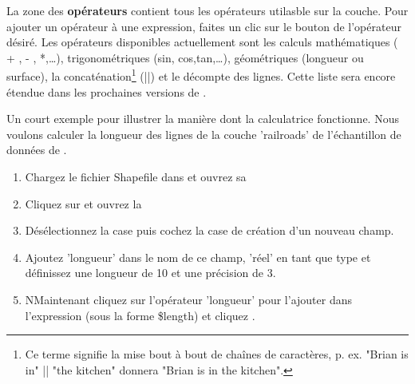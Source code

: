La zone des \textbf{opérateurs} contient tous les opérateurs utilasble sur la couche. Pour ajouter un opérateur à une expression, faites un clic sur le bouton de l'opérateur désiré. Les opérateurs disponibles actuellement sont les calculs mathématiques ( + , - , *,\dots), trigonométriques (sin, cos,tan,\dots), géométriques (longueur ou surface), la concaténation\footnote{Ce terme signifie la mise bout à bout de chaînes de caractères, p. ex. "Brian is in" || "the kitchen" donnera "Brian is in the kitchen".} (||) et le décompte des lignes. Cette liste sera encore étendue dans les prochaines versions de \qg.

Un court exemple pour illustrer la manière dont la calculatrice fonctionne. Nous voulons calculer la longueur des lignes de la couche 'railroads' de l'échantillon de données de \qg.

\begin{enumerate}
\item Chargez le fichier Shapefile  dans \qg et ouvrez sa 
\item Cliquez sur et ouvrez la 
\item Désélectionnez la case  puis cochez la case de création d'un nouveau champ.
\item Ajoutez 'longueur' dans le nom de ce champ, 'réel' en tant que type et définissez une longueur de 10 et une précision de 3.
\item NMaintenant cliquez sur l'opérateur 'longueur' pour l'ajouter dans l'expression (sous la forme \$length) et cliquez .
\end{enumerate}

\FloatBarrier
